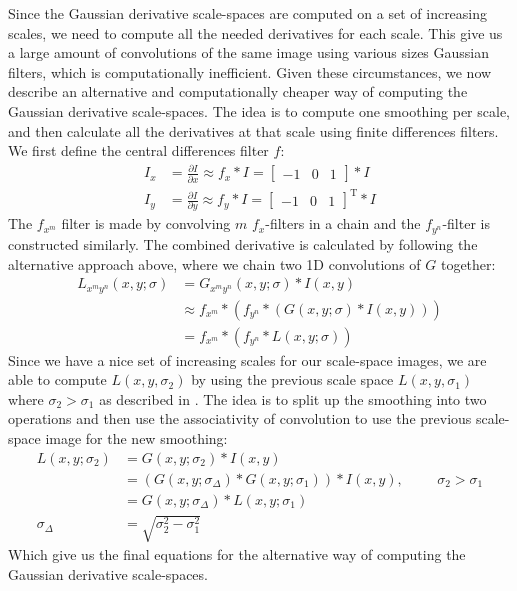\documentclass[thesis.tex]{subfiles}
\begin{document}
Since the Gaussian derivative scale-spaces are computed on a set of increasing scales, we need to compute all the needed derivatives for each scale. This give us a large amount of convolutions of the same image using various sizes Gaussian filters, which is computationally inefficient. Given these circumstances, we now describe an alternative and computationally cheaper way of computing the Gaussian derivative scale-spaces. The idea is to compute one smoothing per scale, and then calculate all the derivatives at that scale using finite differences filters. We first define the central differences filter $f$:
%
\begin{align*}
	I_x &= \frac{\partial I}{\partial x} \approx f_x \ast I = \begin{bmatrix} -1 & 0 & 1\end{bmatrix} \ast I \\
	I_y &= \frac{\partial I}{\partial y} \approx f_y \ast I = \begin{bmatrix} -1 & 0 & 1\end{bmatrix}^\text{T} \ast I
\end{align*}
%
The $f_{x^m}$ filter is made by convolving $m$ $f_x$-filters in a chain and the $f_{y^n}$-filter is constructed similarly. The combined derivative is calculated by following the alternative approach above, where we chain two 1D convolutions of $G$ together:
%
\begin{align*}
	L_{x^m y^n}(x,y;\sigma) &= G_{x^m y^n}(x,y;\sigma) \ast I(x,y) \\
		&\approx f_{x^m} \ast \left( f_{y^n} \ast \left (G(x,y;\sigma) \ast I(x,y) \right) \right) \\
		&= f_{x^m} \ast \left( f_{y^n} \ast L(x,y;\sigma) \right)
\end{align*}
%
Since we have a nice set of increasing scales for our scale-space images, we are able to compute $L(x,y,\sigma_2)$ by using the previous scale space $L(x,y,\sigma_1)$ where $\sigma_2 > \sigma_1$ as described in \cite{tola2008fast}. The idea is to split up the smoothing into two operations and then use the associativity of convolution to use the previous scale-space image for the new smoothing:
%
\begin{align*}
	L(x,y;\sigma_2) &= G(x,y;\sigma_2) \ast I(x,y) \\
					&= (G(x,y;\sigma_\Delta) \ast G(x,y;\sigma_1)) \ast I(x,y),\hspace{1cm}\sigma_2 > \sigma_1 \\
					&= G(x,y;\sigma_\Delta) \ast L(x,y;\sigma_1) \\
			 \sigma_\Delta &= \sqrt{\sigma_2^2 - \sigma_1^2}
\end{align*}
%
Which give us the final equations for the alternative way of computing the Gaussian derivative scale-spaces.
\end{document}
